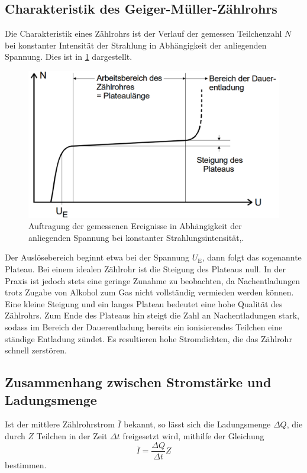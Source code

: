 \subsection{Charakteristik des Geiger-Müller-Zählrohrs}
\label{subsec:theorie3}

Die Charakteristik eines Zählrohrs ist der Verlauf der gemessen Teilchenzahl $N$ bei konstanter Intensität
der Strahlung in Abhängigkeit der anliegenden Spannung. Dies ist in \ref{fig:charakteristik}
dargestellt.

\begin{figure}
  \centering
  \includegraphics[width=\textwidth]{data/charakteristik.png}
  \caption{Auftragung der gemessenen Ereignisse in Abhängigkeit der anliegenden Spannung bei konstanter Strahlungsintensität,\cite{Versuchsanleitung}.}
  \label{fig:charakteristik}
\end{figure}

Der Auslösebereich beginnt etwa bei der Spannung $U_\text{E}$, dann folgt das sogenannte
Plateau. Bei einem idealen Zählrohr ist die Steigung des Plateaus null. In der Praxis
ist jedoch stets eine geringe Zunahme zu beobachten, da Nachentladungen trotz Zugabe
von Alkohol zum Gas nicht vollständig vermieden werden können. Eine kleine Steigung und ein
langes Plateau bedeutet eine hohe Qualität des Zählrohrs. Zum Ende des Plateaus hin
steigt die Zahl an Nachentladungen stark, sodass im Bereich der Dauerentladung bereits
ein ionisierendes Teilchen eine ständige Entladung zündet. Es resultieren hohe Stromdichten, die
das Zählrohr schnell zerstören.

\subsection{Zusammenhang zwischen Stromstärke und Ladungsmenge}
\label{subsec:theorie4}

Ist der mittlere Zählrohrstrom $\overline{I}$ bekannt, so lässt sich die Ladungsmenge
$\Delta Q$, die durch $Z$ Teilchen in der Zeit $\Delta t$ freigesetzt wird, mithilfe der Gleichung
\begin{equation}
  \overline{I} = \frac{\Delta Q}{\Delta t} Z
  \label{eqn:ladung}
\end{equation}
bestimmen.

